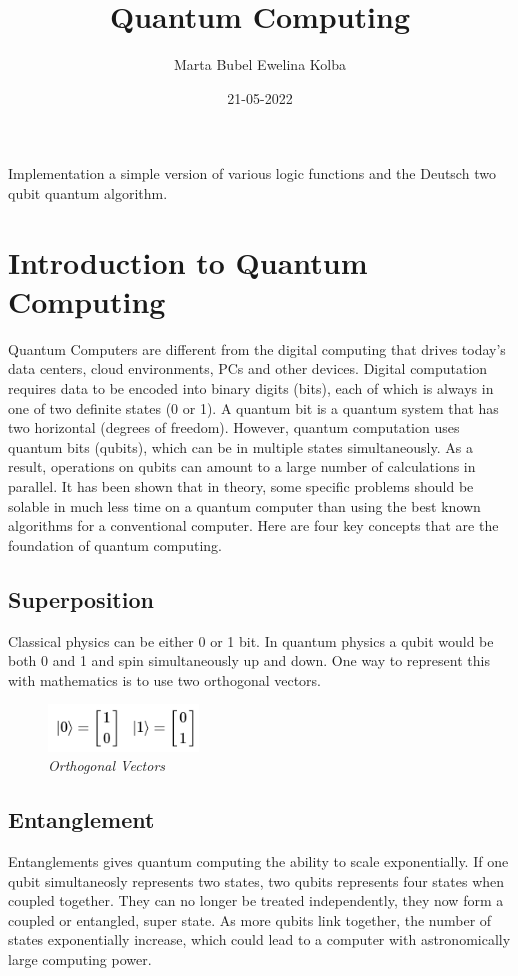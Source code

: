 \documentclass{article}
\title{Quantum Computing}
\author{Marta Bubel Ewelina Kolba}
\date{21-05-2022}
\begin{document}
\maketitle
Implementation a simple version of various logic functions and the Deutsch two qubit quantum algorithm.
\newpage
\renewcommand{\contentsname}{Table of contents}
\tableofcontents
\newpage
\section{Introduction to Quantum Computing}
Quantum Computers are different from the digital computing that drives today's data centers, cloud environments, PCs and other devices. Digital computation requires data to be encoded into binary digits (bits), each of which is always in one of two definite states (0 or 1). A quantum bit is a quantum system that has two horizontal (degrees of freedom). However, quantum computation uses quantum bits (qubits), which can be in multiple states simultaneously. As a result, operations on qubits can amount to a large number of calculations in parallel. It has been shown that in theory, some specific problems should be solable in much less time on a quantum computer than using the best known algorithms for a conventional computer. Here are four key concepts that are the foundation of quantum computing.
\subsection{Superposition}
Classical physics can be either 0 or 1 bit. In quantum physics a qubit would be both 0 and 1 and spin simultaneously up and down.
One way to represent this with mathematics is to use two orthogonal vectors.
\begin{figure}[h]
\begin{center}
\begin{minipage}[b]{4cm}
\centering
\includegraphics[width=4cm]{orgonal_vector.png}\\\textit{Orthogonal Vectors}
\end{minipage}
\end{center}
\end{figure}
\subsection{Entanglement}
Entanglements gives quantum computing the ability to scale exponentially. If one qubit simultaneosly represents two states, two qubits represents four states when coupled together. They can no longer be treated independently, they now form a coupled or entangled, super state. As more qubits link together, the number of states exponentially increase, which could lead to a computer with astronomically large computing power.
\end{document}
